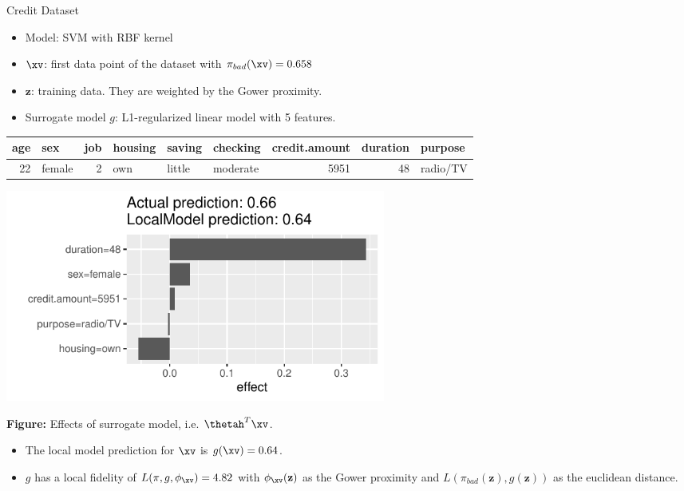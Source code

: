\documentclass[11pt,compress,t,notes=noshow, xcolor=table]{beamer}
\newcommand{\neigh}{\phi_{\xv}}
\newcommand{\zv}{\mathbf{z}}
\begin{document}
\begin{vbframe}{Credit Dataset}
	\begin{itemize}
		\item Model: SVM with RBF kernel
		\item $\xv$: first data point of the dataset with $\pi_{bad}(\xv) = 0.658$
		\item $\zv$: training data. They are weighted by the Gower proximity. 
		\item Surrogate model $g$: L1-regularized linear model with 5 features. 
	\end{itemize}
\vspace{-0.5cm}
	\begin{table}[ht]
		\centering
		\scriptsize
		\begin{tabular}{rlrlllrrl}
			\hline
			age & sex & job & housing & saving & checking & credit.amount & duration & purpose \\ 
			\hline
			 22 & female &   2 & own & little & moderate & 5951 &  48 & radio/TV \\ 
			\hline
		\end{tabular}
	\end{table}
\vspace{-0.5cm}
\begin{center}
	\includegraphics[width=0.55\textwidth]{figure/lime_credit.pdf}
	
	\tiny{\textbf{Figure:} Effects of surrogate model, i.e. $\thetah^T \xv$.}
	
\end{center}

\begin{itemize}
	\item The local model prediction for $\xv$ is $g(\xv) = 0.64$. 
	\item $g$ has a local fidelity of $L(\pi, g, \neigh) = 4.82$ with $\neigh(\zv)$ as the Gower proximity and $L(\pi_{bad}(\zv), g(\zv))$ as the euclidean distance. 
\end{itemize}


\end{vbframe}
\end{document}
